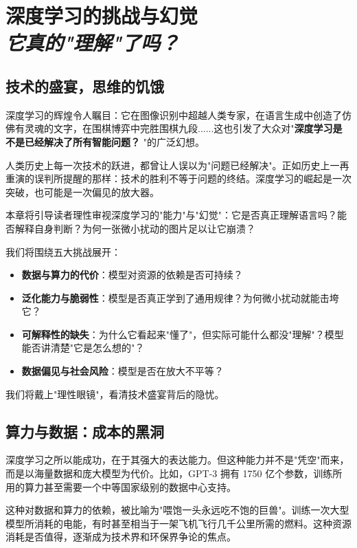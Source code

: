 \chapter{ 深度学习的挑战与幻觉\\\textit{它真的"理解"了吗？}}

\section*{技术的盛宴，思维的饥饿}

深度学习的辉煌令人瞩目：它在图像识别中超越人类专家，在语言生成中创造了仿佛有灵魂的文字，在围棋博弈中完胜围棋九段......这也引发了大众对"\textbf{深度学习是不是已经解决了所有智能问题？} "的广泛幻想。

人类历史上每一次技术的跃进，都曾让人误以为"问题已经解决"。正如历史上一再重演的误判所提醒的那样：技术的胜利不等于问题的终结。深度学习的崛起是一次突破，也可能是一次偏见的放大器。

本章将引导读者理性审视深度学习的"能力"与"幻觉"：它是否真正理解语言吗？能否解释自身判断？为何一张微小扰动的图片足以让它崩溃？

我们将围绕五大挑战展开：
\begin{itemize}
\item  \textbf{数据与算力的代价}：模型对资源的依赖是否可持续？
\item   \textbf{泛化能力与脆弱性}：模型是否真正学到了通用规律？为何微小扰动就能击垮它？
\item   \textbf{可解释性的缺失}：为什么它看起来"懂了"，但实际可能什么都没"理解"？模型能否讲清楚"它是怎么想的"？
\item  \textbf{数据偏见与社会风险}：模型是否在放大不平等？
\end{itemize}

我们将戴上"理性眼镜"，看清技术盛宴背后的隐忧。

\section*{算力与数据：成本的黑洞}

深度学习之所以能成功，在于其强大的表达能力。但这种能力并不是"凭空"而来，而是以海量数据和庞大模型为代价。比如，GPT-3 拥有 1750 亿个参数，训练所用的算力甚至需要一个中等国家级别的数据中心支持。

这种对数据和算力的依赖，被比喻为"喂饱一头永远吃不饱的巨兽"。训练一次大型模型所消耗的电能，有时甚至相当于一架飞机飞行几千公里所需的燃料。这种资源消耗是否值得，逐渐成为技术界和环保界争论的焦点。

